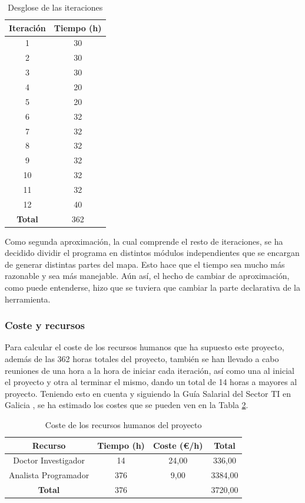 \def\arraystretch{1}%

\begin{table}
	\centering
	\begin{tabular}{ c c }
		\bfseries{Iteración} & \bfseries{Tiempo (h)} \\
		\hline
		1 & 30 \\
		2 & 30 \\
		3 & 30 \\
		4 & 20 \\
		5 & 20 \\
		6 & 32 \\
		7 & 32 \\
		8 & 32 \\
		9 & 32 \\
		10 & 32 \\
		11 & 32 \\
		12 & 40 \\
		\hline
		\bfseries{Total} & 362 \\
		\hline
	\end{tabular}
	\caption{Desglose de las iteraciones}\label{table:iteraciones}
\end{table}

Como segunda aproximación, la cual comprende el resto de iteraciones, se ha decidido dividir el programa en distintos módulos independientes que se encargan de generar distintas partes del mapa. Esto hace que el tiempo sea mucho más razonable y sea más manejable. Aún así, el hecho de cambiar de aproximación, como puede entenderse, hizo que se tuviera que cambiar la parte declarativa de la herramienta.

\subsubsection{Coste y recursos}

Para calcular el coste de los recursos humanos que ha supuesto este proyecto, además de las 362 horas totales del proyecto, también se han llevado a cabo reuniones de una hora a la hora de iniciar cada iteración, así como una al inicial el proyecto y otra al terminar el mismo, dando un total de 14 horas a mayores al proyecto. Teniendo esto en cuenta y siguiendo la Guía Salarial del Sector TI en Galicia \cite{guiasalarial}, se ha estimado los costes que se pueden ven en la Tabla \ref{table:costehumano}.

\begin{table}[!h]
	\centering
	\begin{tabular}{ c c c c }
		\bfseries{Recurso} & \bfseries{Tiempo (h)} & \bfseries{Coste (\euro/h)} & \bfseries{Total} \\
		\hline
		Doctor Investigador & 14 & 24,00 & 336,00 \\
		Analista Programador & 376 & 9,00 & 3384,00 \\
		\hline
		\bfseries{Total} & 376 & & 3720,00 \\
		\hline
	\end{tabular}
	\caption{Coste de los recursos humanos del proyecto}\label{table:costehumano}
\end{table}

